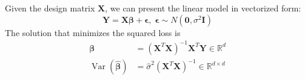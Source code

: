 \documentclass{article}
\DeclareMathOperator{\Var}{Var}
\begin{document}
    \begin{theorem}
      Given the design matrix $\mathbf{X}$, we can present the linear model in vectorized form: 
      \begin{equation}
        \mathbf{Y} = \mathbf{X} \boldsymbol{\beta} + \boldsymbol{\epsilon}, \; \boldsymbol{\epsilon} \sim N(\mathbf{0}, \sigma^2 \mathbf{I})
      \end{equation}
      The solution that minimizes the squared loss is 
      \begin{align*}
        \boldsymbol{\beta} & = (\mathbf{X}^T \mathbf{X})^{-1} \mathbf{X}^T \mathbf{Y} \in \mathbb{R}^d \\
        \Var(\hat{\boldsymbol{\beta}}) & = \hat{\sigma}^2 (\mathbf{X}^T \mathbf{X})^{-1} \in \mathbb{R}^{d \times d}
      \end{align*}
    \end{theorem}
\end{document}
